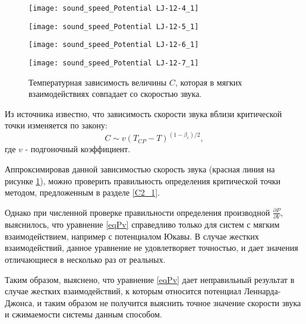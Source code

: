 \begin{figure}[h]
\begin{center}
\begin{minipage}[h]{0.45\linewidth}
\texttt{[image: sound\_speed\_Potential LJ-12-4\_1]}
\end{minipage}
\begin{minipage}[h]{0.45\linewidth}
\texttt{[image: sound\_speed\_Potential LJ-12-5\_1]}
\end{minipage}

\begin{minipage}[h]{0.45\linewidth}
\texttt{[image: sound\_speed\_Potential LJ-12-6\_1]}
\end{minipage}
\begin{minipage}[h]{0.45\linewidth}
\texttt{[image: sound\_speed\_Potential LJ-12-7\_1]}
\end{minipage}
\caption{Температурная зависимость величины $C$, которая в мягких взаимодействиях совпадает со скоростью звука.}
\label{risC}
\end{center}
\end{figure}

Из источника \cite{soundSpeed} известно, что зависимость скорости звука вблизи критической точки изменяется по закону:
\begin{equation}
    C \sim v(T_{CP} - T)^{(1-\beta_c)/2},
    \label{eqFitC}
\end{equation}
где $v$ - подгоночный коэффициент.

Аппроксимировав данной зависимостью скорость звука (красная линия на рисунке \ref{risC}), можно проверить правильность определения критической точки методом, предложенным в разделе \ref{C2_1}.

Однако при численной проверке правильности определения производной $\frac{\partial P}{\partial V}$, выяснилось, что уравнение \ref{eqPv} справедливо только для систем с мягким взаимодействием, например с потенциалом Юкавы. В случае жестких взаимодействий, данное уравнение не удовлетворяет точностью, и дает значения отличающиеся в несколько раз от реальных.

Таким образом, выяснено, что уравнение \ref{eqPv} дает неправильный результат в случае жестких взаимодействий, к которым относится потенциал Леннарда-Джонса, и таким образом не получится выяснить точное значение скорости звука и сжимаемости системы данным способом.  

